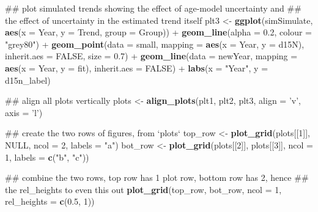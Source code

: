 \documentclass[12pt,]{article}
\newenvironment{Shaded}{\begin{snugshade}}{\end{snugshade}}
\newcommand{\KeywordTok}[1]{\textcolor[rgb]{0.13,0.29,0.53}{\textbf{{#1}}}}
\newcommand{\DataTypeTok}[1]{\textcolor[rgb]{0.13,0.29,0.53}{{#1}}}
\newcommand{\DecValTok}[1]{\textcolor[rgb]{0.00,0.00,0.81}{{#1}}}
\newcommand{\FloatTok}[1]{\textcolor[rgb]{0.00,0.00,0.81}{{#1}}}
\newcommand{\StringTok}[1]{\textcolor[rgb]{0.31,0.60,0.02}{{#1}}}
\newcommand{\OtherTok}[1]{\textcolor[rgb]{0.56,0.35,0.01}{{#1}}}
\newcommand{\NormalTok}[1]{{#1}}
\begin{document}
\begin{Shaded}
\begin{Highlighting}[]
\NormalTok{## plot simulated trends showing the effect of age-model uncertainty and}
\NormalTok{## the effect of uncertainty in the estimated trend itself}
\NormalTok{plt3 <-}\StringTok{ }\KeywordTok{ggplot}\NormalTok{(simSimulate, }\KeywordTok{aes}\NormalTok{(}\DataTypeTok{x =} \NormalTok{Year, }\DataTypeTok{y =} \NormalTok{Trend, }\DataTypeTok{group =} \NormalTok{Group)) +}
\StringTok{    }\KeywordTok{geom_line}\NormalTok{(}\DataTypeTok{alpha =} \FloatTok{0.2}\NormalTok{, }\DataTypeTok{colour =} \StringTok{"grey80"}\NormalTok{) +}
\StringTok{    }\KeywordTok{geom_point}\NormalTok{(}\DataTypeTok{data =} \NormalTok{small,}
               \DataTypeTok{mapping =} \KeywordTok{aes}\NormalTok{(}\DataTypeTok{x =} \NormalTok{Year, }\DataTypeTok{y =} \NormalTok{d15N),}
               \DataTypeTok{inherit.aes =} \OtherTok{FALSE}\NormalTok{,}
               \DataTypeTok{size =} \FloatTok{0.7}\NormalTok{) +}
\StringTok{    }\KeywordTok{geom_line}\NormalTok{(}\DataTypeTok{data =} \NormalTok{newYear,}
              \DataTypeTok{mapping =} \KeywordTok{aes}\NormalTok{(}\DataTypeTok{x =} \NormalTok{Year, }\DataTypeTok{y =} \NormalTok{fit),}
              \DataTypeTok{inherit.aes =} \OtherTok{FALSE}\NormalTok{) +}
\StringTok{    }\KeywordTok{labs}\NormalTok{(}\DataTypeTok{x =} \StringTok{"Year"}\NormalTok{, }\DataTypeTok{y =} \NormalTok{d15n_label)}

\NormalTok{## align all plots vertically}
\NormalTok{plots <-}\StringTok{ }\KeywordTok{align_plots}\NormalTok{(plt1, plt2, plt3, }\DataTypeTok{align =} \StringTok{'v'}\NormalTok{, }\DataTypeTok{axis =} \StringTok{'l'}\NormalTok{)}


\NormalTok{## create the two rows of figures, from `plots`}
\NormalTok{top_row <-}\StringTok{ }\KeywordTok{plot_grid}\NormalTok{(plots[[}\DecValTok{1}\NormalTok{]], }\OtherTok{NULL}\NormalTok{, }\DataTypeTok{ncol =} \DecValTok{2}\NormalTok{, }\DataTypeTok{labels =} \StringTok{"a"}\NormalTok{)}
\NormalTok{bot_row <-}\StringTok{ }\KeywordTok{plot_grid}\NormalTok{(plots[[}\DecValTok{2}\NormalTok{]], plots[[}\DecValTok{3}\NormalTok{]], }\DataTypeTok{ncol =} \DecValTok{1}\NormalTok{, }\DataTypeTok{labels =} \KeywordTok{c}\NormalTok{(}\StringTok{"b"}\NormalTok{, }\StringTok{"c"}\NormalTok{))}

\NormalTok{## combine the two rows, top row has 1 plot row, bottom row has 2, hence}
\NormalTok{## the rel_heights to even this out}
\KeywordTok{plot_grid}\NormalTok{(top_row, bot_row, }\DataTypeTok{ncol =} \DecValTok{1}\NormalTok{, }\DataTypeTok{rel_heights =} \KeywordTok{c}\NormalTok{(}\FloatTok{0.5}\NormalTok{, }\DecValTok{1}\NormalTok{))}
\end{Highlighting}
\end{Shaded}
\end{document}
